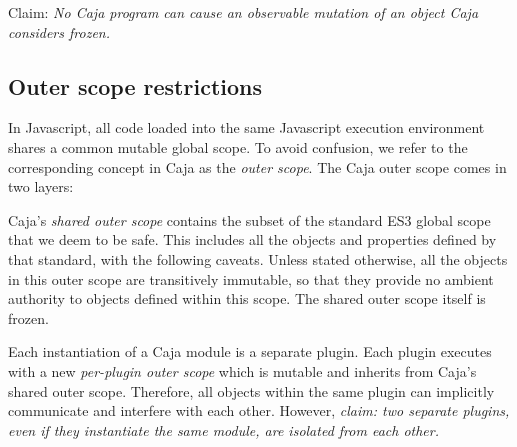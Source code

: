 \documentclass[letterpaper,twocolumn,10pt]{article}
\begin{document}
Claim: \emph{No Caja program can cause an observable mutation of an object
Caja considers frozen.}


\subsection{Outer scope restrictions}

In Javascript, all code loaded into the same Javascript execution environment 
shares a common mutable global scope. To avoid confusion, we refer to the 
corresponding concept in Caja as the \emph{outer scope}. The Caja outer scope
 comes in two layers:

Caja's \emph{shared outer scope} contains the subset of the standard ES3 
global scope that we deem to be safe. This includes all the objects and 
properties defined by that standard, with the following caveats. Unless 
stated otherwise, all the objects in this outer scope are transitively 
immutable, so that they provide no ambient authority to objects defined 
within this scope. The shared outer scope itself is frozen.

Each instantiation of a Caja module is a separate plugin. Each plugin 
executes with a new \emph{per-plugin outer scope} which is mutable and 
inherits from Caja's shared outer scope. Therefore, all objects within the 
same plugin can implicitly communicate and interfere with each other. 
However, \emph{claim: two separate plugins, even if they instantiate the same 
module, are isolated from each other.}
\end{document}
